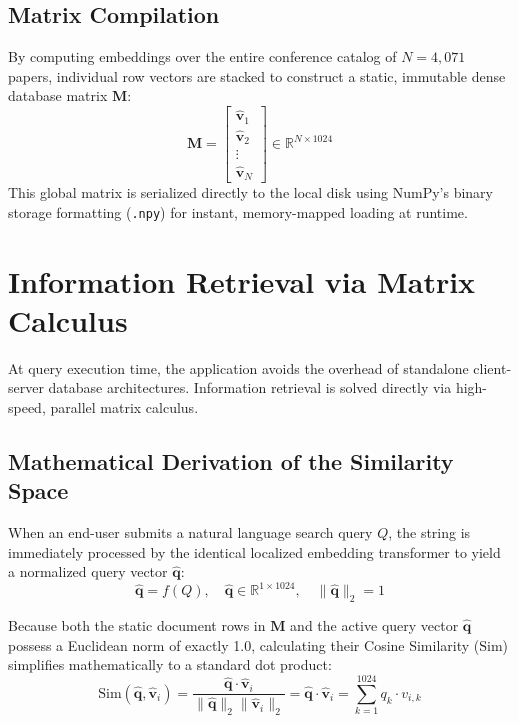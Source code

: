 \documentclass[12pt,a4paper]{article}
\begin{document}
\subsection{Matrix Compilation}
By computing embeddings over the entire conference catalog of $N = 4,071$ papers, individual row vectors are stacked to construct a static, immutable dense database matrix $\mathbf{M}$:
\begin{equation}
    \mathbf{M} = \begin{bmatrix} \hat{\mathbf{v}}_1 \\ \hat{\mathbf{v}}_2 \\ \vdots \\ \hat{\mathbf{v}}_N \end{bmatrix} \in \mathbb{R}^{N \times 1024}
\end{equation}
This global matrix is serialized directly to the local disk using NumPy's binary storage formatting (\texttt{.npy}) for instant, memory-mapped loading at runtime.

\section{Information Retrieval via Matrix Calculus}
At query execution time, the application avoids the overhead of standalone client-server database architectures. Information retrieval is solved directly via high-speed, parallel matrix calculus.

\subsection{Mathematical Derivation of the Similarity Space}
When an end-user submits a natural language search query $Q$, the string is immediately processed by the identical localized embedding transformer to yield a normalized query vector $\hat{\mathbf{q}}$:
\begin{equation}
    \hat{\mathbf{q}} = f(Q), \quad \hat{\mathbf{q}} \in \mathbb{R}^{1 \times 1024}, \quad \|\hat{\mathbf{q}}\|_2 = 1
\end{equation}

Because both the static document rows in $\mathbf{M}$ and the active query vector $\hat{\mathbf{q}}$ possess a Euclidean norm of exactly 1.0, calculating their Cosine Similarity ($\text{Sim}$) simplifies mathematically to a standard dot product:
\begin{equation}
    \text{Sim}(\hat{\mathbf{q}}, \hat{\mathbf{v}}_i) = \frac{\hat{\mathbf{q}} \cdot \hat{\mathbf{v}}_i}{\|\hat{\mathbf{q}}\|_2 \|\hat{\mathbf{v}}_i\|_2} = \hat{\mathbf{q}} \cdot \hat{\mathbf{v}}_i = \sum_{k=1}^{1024} q_k \cdot v_{i,k}
\end{equation}
\end{document}
